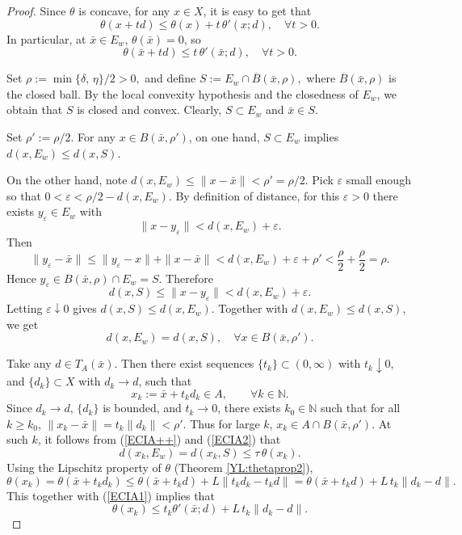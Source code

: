 \documentclass[11pt]{article}
\begin{document}
\begin{proof}
	Since $\theta$ is concave,  for any $x \in X$,  it is easy to get that 
	\[
	\theta(x+td) \le \theta(x) + t\,\theta'(x;d),\quad \forall t>0.
	\]
	In particular, at $\bar x\in E_w$, $\theta(\bar x)=0$, so
	\begin{equation}\label{ECIA1}
		\theta(\bar x+td) \le t\,\theta'(\bar x;d),\quad \forall t>0.  
	\end{equation}
	
 
	Set
$	\rho := \min\{\delta,\, \eta \}/2 >0,$  	and define
$	S := E_w \cap \overline{B}(\bar x,\rho), $
	where $\overline{B}(\bar x,\rho)$ is the closed ball.  By the local convexity hypothesis and the closedness of $E_w$,   we obtain that $S$ is  closed and convex. Clearly, $S\subset E_w$ and $\bar x\in S$.
	
 
	Set $\rho' := \rho/2$. For any  $x\in B(\bar x,\rho')$, on one hand, $S\subset E_w$ implies $d(x,E_w)\le d(x,S)$.
	
		On the other hand, note $d(x,E_w)\le \|x-\bar x\| < \rho' = \rho/2$. Pick $\varepsilon$ small enough so that $0<\varepsilon < \rho/2 - d(x,E_w)$. By definition of distance, for this $\varepsilon>0$ there exists $y_\varepsilon\in E_w$ with
	$$	\|x-y_\varepsilon\| < d(x,E_w) + \varepsilon.$$
	Then
	\[
	\|y_\varepsilon-\bar x\| \le \|y_\varepsilon-x\| + \|x-\bar x\| < d(x,E_w)+\varepsilon+\rho' < \frac{\rho}{2} + \frac{\rho}{2} = \rho.
	\]
	Hence $y_\varepsilon\in B(\bar x,\rho)\cap E_w = S$. Therefore
	\[
	d(x,S) \le \|x-y_\varepsilon\| < d(x,E_w) + \varepsilon.
	\]
	Letting $\varepsilon\downarrow0$ gives $d(x,S)\le d(x,E_w)$. Together with $d(x,E_w)\le d(x,S)$,  we get
\begin{equation}\label{ECIA2}
		d(x,E_w)=d(x,S),\quad \forall x\in B(\bar x,\rho').  
	\end{equation}
	
 
	Take any $d\in T_A(\bar x)$. Then  there exist sequences $\{t_k\}\subset (0,\infty)$ with $t_k\downarrow0$, and $\{d_k\}\subset X$ with $d_k\to d$, such that
	\[
	x_k := \bar x + t_k d_k \in A,\qquad \forall k\in\mathbb N.
	\]
	Since $d_k\to d$, $\{d_k\}$ is bounded, and $t_k\to0$, there exists $k_0 \in\mathbb N$ such that for all $k\ge k_0$, $\|x_k-\bar x\| = t_k\|d_k\| < \rho'$. Thus for large $k$, $x_k\in A\cap B(\bar x,\rho')$.
	At such $k$,  it follows from  (\ref{ECIA++})   and   (\ref{ECIA2})    that
	\begin{equation}\label{ECIA3}
		d(x_k,E_w) = d(x_k,S) \le \tau\,\theta(x_k).  
	\end{equation}
		Using the Lipschitz property of $\theta$ (Theorem \ref{YL:thetaprop2}),
 	$$\theta(x_k) = \theta(\bar x + t_k d_k) \le \theta(\bar x + t_k d) + L\|t_k d_k - t_k d\| = \theta(\bar x + t_k d) + L\,t_k\|d_k-d\|. $$
	This together with  (\ref{ECIA1})   implies that   
 	\begin{equation}\label{ECIA4}
		\theta(x_k) \le t_k\theta'(\bar x;d) + L\,t_k\|d_k-d\|.  
	\end{equation}
	

\end{proof}
\end{document}
